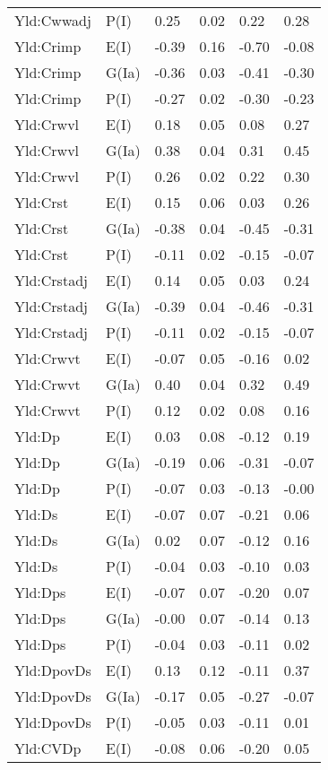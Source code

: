 \begin{center}
\begin{longtable}{|p{1.1in}|p{0.7in}|p{0.7in}|p{0.6in}|p{0.6in}|p{0.6in}|}
  Yld:Cwwadj & P(I) & 0.25 & 0.02 & 0.22 & 0.28 \\ 
  Yld:Crimp & E(I) & -0.39 & 0.16 & -0.70 & -0.08 \\ 
  Yld:Crimp & G(Ia) & -0.36 & 0.03 & -0.41 & -0.30 \\ 
  Yld:Crimp & P(I) & -0.27 & 0.02 & -0.30 & -0.23 \\ 
  Yld:Crwvl & E(I) & 0.18 & 0.05 & 0.08 & 0.27 \\ 
  Yld:Crwvl & G(Ia) & 0.38 & 0.04 & 0.31 & 0.45 \\ 
  Yld:Crwvl & P(I) & 0.26 & 0.02 & 0.22 & 0.30 \\ 
  Yld:Crst & E(I) & 0.15 & 0.06 & 0.03 & 0.26 \\ 
  Yld:Crst & G(Ia) & -0.38 & 0.04 & -0.45 & -0.31 \\ 
  Yld:Crst & P(I) & -0.11 & 0.02 & -0.15 & -0.07 \\ 
  Yld:Crstadj & E(I) & 0.14 & 0.05 & 0.03 & 0.24 \\ 
  Yld:Crstadj & G(Ia) & -0.39 & 0.04 & -0.46 & -0.31 \\ 
  Yld:Crstadj & P(I) & -0.11 & 0.02 & -0.15 & -0.07 \\ 
  Yld:Crwvt & E(I) & -0.07 & 0.05 & -0.16 & 0.02 \\ 
  Yld:Crwvt & G(Ia) & 0.40 & 0.04 & 0.32 & 0.49 \\ 
  Yld:Crwvt & P(I) & 0.12 & 0.02 & 0.08 & 0.16 \\ 
  Yld:Dp & E(I) & 0.03 & 0.08 & -0.12 & 0.19 \\ 
  Yld:Dp & G(Ia) & -0.19 & 0.06 & -0.31 & -0.07 \\ 
  Yld:Dp & P(I) & -0.07 & 0.03 & -0.13 & -0.00 \\ 
  Yld:Ds & E(I) & -0.07 & 0.07 & -0.21 & 0.06 \\ 
  Yld:Ds & G(Ia) & 0.02 & 0.07 & -0.12 & 0.16 \\ 
  Yld:Ds & P(I) & -0.04 & 0.03 & -0.10 & 0.03 \\ 
  Yld:Dps & E(I) & -0.07 & 0.07 & -0.20 & 0.07 \\ 
  Yld:Dps & G(Ia) & -0.00 & 0.07 & -0.14 & 0.13 \\ 
  Yld:Dps & P(I) & -0.04 & 0.03 & -0.11 & 0.02 \\ 
  Yld:DpovDs & E(I) & 0.13 & 0.12 & -0.11 & 0.37 \\ 
  Yld:DpovDs & G(Ia) & -0.17 & 0.05 & -0.27 & -0.07 \\ 
  Yld:DpovDs & P(I) & -0.05 & 0.03 & -0.11 & 0.01 \\ 
  Yld:CVDp & E(I) & -0.08 & 0.06 & -0.20 & 0.05 \\ 

\end{longtable}
\end{center}
